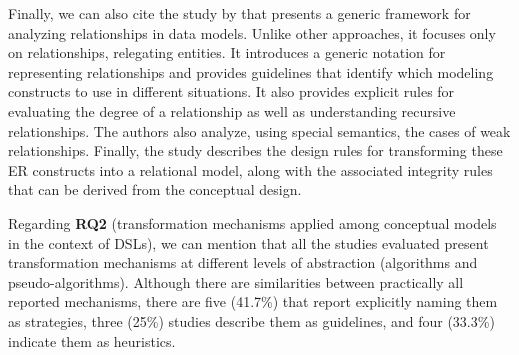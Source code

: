 Finally, we can also cite the study by \cite{Dey:1999} that presents a generic framework for analyzing relationships in data models.
Unlike other approaches, it focuses only on relationships, relegating entities.
It introduces a generic notation for representing relationships and provides guidelines that identify which modeling constructs to use in different situations.
It also provides explicit rules for evaluating the degree of a relationship as well as understanding recursive relationships.
The authors also analyze, using special semantics, the cases of weak relationships.
Finally, the study describes the design rules for transforming these ER constructs into a relational model, along with the associated integrity rules that can be derived from the conceptual design.

Regarding \textbf{RQ2} (transformation mechanisms applied among conceptual models in the context of DSLs), we can mention that all the studies evaluated present transformation mechanisms at different levels of abstraction (algorithms and pseudo-algorithms).
Although there are similarities between practically all reported mechanisms, there are five (41.7\%) that report explicitly naming them as strategies, three (25\%) studies describe them as guidelines, and four (33.3\%) indicate them as heuristics.

